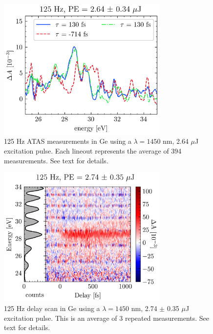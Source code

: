\begin{figure}
	\centering
	\includegraphics[width=0.75\textwidth]{figures/chap3/StaticOD_avg_125Hz_2p64uJ.png}
	\caption{125 Hz ATAS measurements in Ge using a $\lambda = 1450$ nm, 2.64 $\mu$J excitation pulse. Each lineout represents the average of 394 measurements. See text for details.}
	\label{fig:125Hz_Ge_ATAS:static_delays}
\end{figure}

\begin{figure}
	\centering
	\includegraphics[width=0.75\textwidth]{figures/chap3/Delay234_1450nm_125HzuJ.png}
	\caption{125 Hz delay scan in Ge using a $\lambda = 1450$ nm, 2.74 $\pm$ 0.35 $\mu$J excitation pulse. This is an average of 3 repeated measurements. See text for details.}
	\label{fig:125Hz_Ge_ATAS:delay_scan}
\end{figure}

